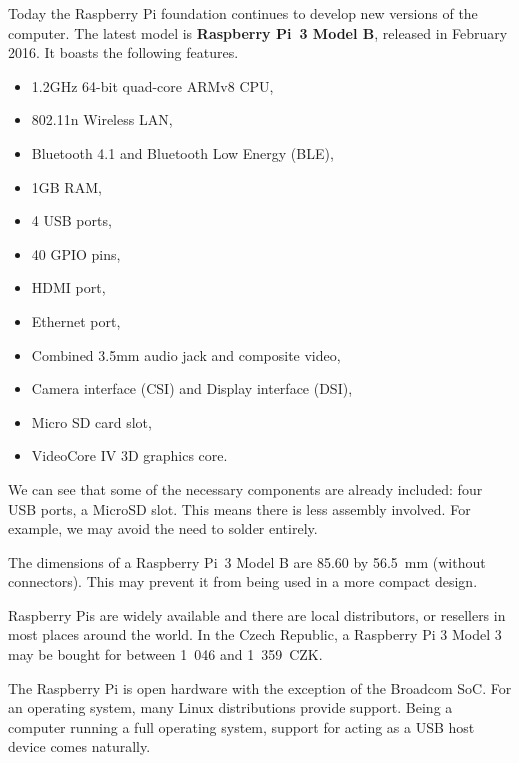             Today the Raspberry Pi foundation continues to develop new versions of the computer\cite{rpi-products}.  The latest model is \textbf{Raspberry Pi~3 Model B}, released in February 2016.  It boasts the following features\cite{rpi-3}.
            
            \begin{itemize}
                \item 1.2GHz 64-bit quad-core ARMv8 CPU,
                \item 802.11n Wireless LAN,
                \item Bluetooth 4.1 and Bluetooth Low Energy (BLE),
                \item 1GB RAM,
                \item 4 USB ports,
                \item 40 GPIO pins,
                \item HDMI port,
                \item Ethernet port,
                \item Combined 3.5mm audio jack and composite video,
                \item Camera interface (CSI) and Display interface (DSI),
                \item Micro SD card slot,
                \item VideoCore IV 3D graphics core.
            \end{itemize}
            
            We can see that some of the necessary components are already included: four USB ports, a MicroSD slot.  This means there is less assembly involved.  For example, we may avoid the need to solder entirely.
            
            The dimensions of a Raspberry Pi~3 Model B are 85.60 by 56.5~mm (without connectors).  This may prevent it from being used in a more compact design.
            
            Raspberry Pis are widely available and there are local distributors, or resellers in most places around the world\cite{rpi-buying-guide}\cite{rpi-buying-links-by-country}.  In the Czech Republic, a Raspberry Pi 3 Model 3 may be bought for between 1~046 and 1~359~CZK\cite{rpi-rpi3-rpishop}\cite{rpi-rpi3-minidroid}\cite{rpi-rpi3-alza}.
            
            The Raspberry Pi is open hardware with the exception of the Broadcom SoC.  For an operating system, many Linux distributions provide support\cite{rpi-opensource}.  Being a computer running a full operating system, support for acting as a USB host device comes naturally.
            
